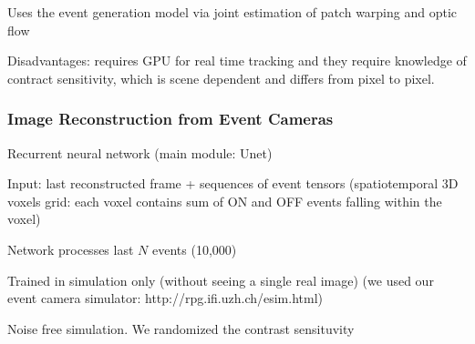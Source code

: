Uses the event generation model via joint estimation of patch warping and optic flow

Disadvantages: requires GPU for real time tracking and they require knowledge of contract sensitivity, which is scene dependent and differs from pixel to pixel.	

\subsubsection{Image Reconstruction from Event Cameras}

Recurrent neural network (main module: Unet) 

Input: last reconstructed frame + sequences of event tensors (spatiotemporal 3D voxels grid: each voxel contains sum of ON and OFF events falling within the voxel)

Network processes last $N$ events (10,000) 

Trained in simulation only (without seeing a single real image) (we used our event camera simulator: http://rpg.ifi.uzh.ch/esim.html) 

Noise free simulation. We randomized the contrast sensituvity
